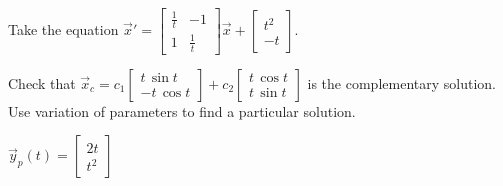 \begin{exercise}
Take the equation
$\displaystyle
{\vec{x}}'
=
\begin{bmatrix}
\frac{1}{t} & -1 \\
1 & \frac{1}{t}
\end{bmatrix}
\vec{x}
+ \begin{bmatrix} t^2 \\ -t \end{bmatrix} .
$
\begin{tasks}
\task
Check that
$\displaystyle
\vec{x}_c =
c_1
\begin{bmatrix}
t\, \sin t \\
- t \, \cos t
\end{bmatrix}
+
c_2
\begin{bmatrix}
t\, \cos t \\
t \, \sin t
\end{bmatrix}
$
is the complementary solution.
\task
Use variation of parameters to
find a particular solution.
\end{tasks}
\end{exercise}
\comboSol{%
}
{%
$\vec{y}_p(t) = \left[\begin{smallmatrix} 2t \\ t^2 \end{smallmatrix}\right]$
}

\setcounter{exercise}{100}








